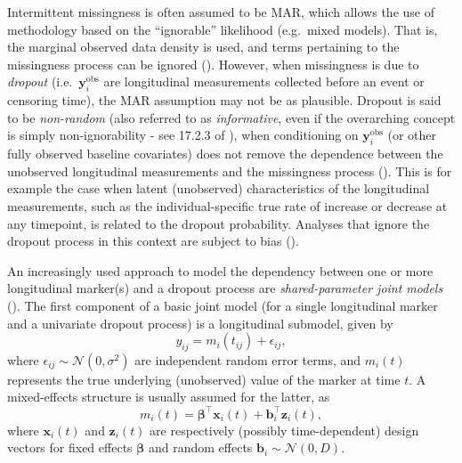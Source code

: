 \documentclass[
  letterpaper,
  DIV=11,
  numbers=noendperiod]{scrreprt}
\begin{document}
Intermittent missingness is often assumed to be MAR, which allows the
use of methodology based on the ``ignorable'' likelihood (e.g.~mixed
models). That is, the marginal observed data density is used, and terms
pertaining to the missingness process can be ignored
(). However, when missingness is due to \emph{dropout}
(i.e.~\(\mathbf{y}_{i}^{\text{obs}}\) are longitudinal measurements
collected before an event or censoring time), the MAR assumption may not
be as plausible. Dropout is said to be \emph{non-random} (also referred
to as \emph{informative}, even if the overarching concept is simply
non-ignorability - see 17.2.3 of
), when conditioning on
\(\mathbf{y}_{i}^{\text{obs}}\) (or other fully observed baseline
covariates) does not remove the dependence between the unobserved
longitudinal measurements and the missingness process
(). This is for example the case when latent
(unobserved) characteristics of the longitudinal measurements, such as
the individual-specific true rate of increase or decrease at any
timepoint, is related to the dropout probability. Analyses that ignore
the dropout process in this context are subject to bias
().

An increasingly used approach to model the dependency between one or
more longitudinal marker(s) and a dropout process are
\emph{shared-parameter joint models}
(). The first component of a basic joint model (for a single
longitudinal marker and a univariate dropout process) is a longitudinal
submodel, given by \[
y_{ij} = m_i(t_{ij}) + \epsilon_{ij},
\] where \(\epsilon_{ij} \sim \mathcal{N}(0, \sigma^2)\) are independent
random error terms, and \(m_i(t)\) represents the true underlying
(unobserved) value of the marker at time \(t\). A mixed-effects
structure is usually assumed for the latter, as \[
m_i(t) = \boldsymbol{\beta}^\intercal \mathbf{x}_i(t) + \boldsymbol{b}_i^\intercal \mathbf{z}_i(t),
\] where \(\mathbf{x}_i(t)\) and \(\mathbf{z}_i(t)\) are respectively
(possibly time-dependent) design vectors for fixed effects
\(\boldsymbol{\beta}\) and random effects
\(\boldsymbol{b}_i \sim \mathcal{N}(0, D)\).
\end{document}
